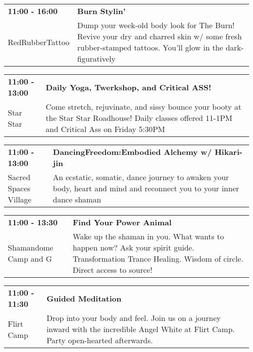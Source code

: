 \begin{tabular}{ p{1in} p{2.2in} }
    \textbf{11:00 - 16:00} & \textbf{Burn Stylin'} \\
    RedRubberTattoo \newline  & Dump your week-old body look for The Burn! Revive your dry and charred skin w/ some fresh rubber-stamped tattoos. You'll glow in the dark-figuratively \\
    \hline 
\end{tabular}
    
\begin{tabular}{ p{1in} p{2.2in} }
    \textbf{11:00 - 13:00} & \textbf{Daily Yoga, Twerkshop, and Critical ASS!} \\
    Star Star \newline  & Come stretch, rejuvinate, and sissy bounce your booty at the Star Star Roadhouse! Daily classes offered 11-1PM and Critical Ass on Friday 5:30PM \\
    \hline 
\end{tabular}
    
\begin{tabular}{ p{1in} p{2.2in} }
    \textbf{11:00 - 13:00} & \textbf{DancingFreedom:Embodied Alchemy w/ Hikari-jin} \\
    Sacred Spaces Village \newline  & An ecstatic, somatic, dance journey to awaken your body, heart and mind and  reconnect you to your inner dance shaman \\
    \hline 
\end{tabular}
    
\begin{tabular}{ p{1in} p{2.2in} }
    \textbf{11:00 - 13:30} & \textbf{Find Your Power Animal} \\
    Shamandome Camp \newline 615 and G & Wake up the shaman in you. What wants to happen now? Ask your spirit guide. Transformation Trance Healing. Wisdom of circle. Direct access to source! \\
    \hline 
\end{tabular}
    
\begin{tabular}{ p{1in} p{2.2in} }
    \textbf{11:00 - 11:30} & \textbf{Guided Meditation} \\
    Flirt Camp \newline  & Drop into your body and feel. Join us on a journey inward with the incredible Angel White at Flirt Camp. Party open-hearted afterwards. \\
    \hline 
\end{tabular}
    
